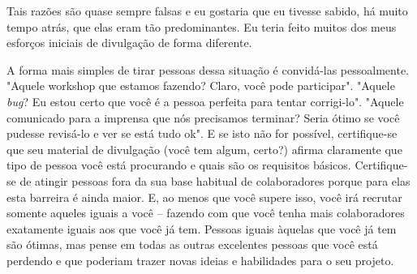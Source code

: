 Tais razões são quase sempre falsas e eu gostaria que eu tivesse sabido, há muito tempo atrás, que
elas eram tão predominantes. Eu teria feito muitos dos meus esforços iniciais de divulgação
de forma diferente.

A forma mais simples de tirar pessoas dessa situação é convidá-las pessoalmente.
"Aquele workshop que estamos fazendo? Claro, você pode participar". "Aquele
\textit{bug}? Eu estou certo que você é a pessoa perfeita para tentar corrigi-lo".
"Aquele comunicado para a imprensa que nós precisamos terminar? Seria ótimo se
você pudesse revisá-lo e ver se está tudo ok". E se isto não for possível, certifique-se
que seu material de divulgação (você tem algum, certo?) afirma claramente que tipo
de pessoa você está procurando e quais são os requisitos básicos. Certifique-se de
atingir pessoas fora da sua base habitual de colaboradores porque para elas esta
barreira é ainda maior. E, ao menos que você supere isso, você irá recrutar somente
aqueles iguais a você -- fazendo com que você tenha mais colaboradores exatamente
iguais aos que você já tem. Pessoas iguais àquelas que você já tem são ótimas,
mas pense em todas as outras excelentes pessoas que você está perdendo e que poderiam
trazer novas ideias e habilidades para o seu projeto.

